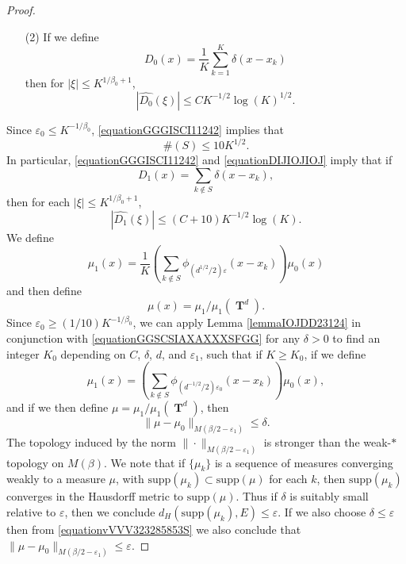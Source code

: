 \documentclass[12pt,reqno]{article}
\numberwithin{equation}{section}
\DeclareMathOperator{\TT}{\mathbf{T}}
\begin{document}
\begin{proof}
\begin{itemize}
        \item[(2)] If we define
        \[ D_0(x) = \frac{1}{K} \sum_{k = 1}^K \delta(x - x_k) \]
        then for $|\xi| \leq K^{1/\beta_0 + 1}$,
        \begin{equation} \label{equationGGGISCI11242}
            |\widehat{D_0}(\xi)| \leq C K^{-1/2} \log(K)^{1/2}.
        \end{equation}
    \end{itemize}
    Since $\varepsilon_0 \leq K^{-1/\beta_0}$, \eqref{equationGGGISCI11242} implies that
    \begin{equation} \label{equationDIJIOJIOJ}
        \#(S) \leq 10 K^{1/2}.
    \end{equation}
    In particular, \eqref{equationGGGISCI11242} and \eqref{equationDIJIOJIOJ} imply that if
    \[ D_1(x) = \sum_{k \not \in S} \delta(x - x_k), \]
    then for each $|\xi| \leq K^{1/\beta_0 + 1}$,
    \begin{equation} \label{equationGGSCSIAXAXXXSFGG}
        |\widehat{D_1}(\xi)| \leq (C+10) K^{-1/2} \log(K).
    \end{equation}
    We define
    \[ \mu_1(x) = \frac{1}{K} \left( \sum_{k \not \in S} \phi_{(d^{1/2}/2) \varepsilon}(x - x_k) \right) \mu_0(x) \]
    and then define
    \begin{equation}
        \mu(x) = \mu_1 / \mu_1(\TT^d).
    \end{equation}
    Since $\varepsilon_0 \geq (1/10) K^{-1/\beta_0}$, we can apply Lemma \ref{lemmaIOJDD23124} in conjunction with \eqref{equationGGSCSIAXAXXXSFGG} for any $\delta > 0$ to find an integer $K_0$ depending on $C$, $\delta$, $d$, and $\varepsilon_1$, such that if $K \geq K_0$, if we define
    \[ \mu_1(x) = \left( \sum_{k \not \in S} \phi_{(d^{-1/2}/2) \varepsilon_0}(x - x_k) \right) \mu_0(x), \]
    and if we then define $\mu = \mu_1 / \mu_1(\TT^d)$, then
    \begin{equation} \label{equationvVVV323285853S}
        \| \mu - \mu_0 \|_{M(\beta/2 - \varepsilon_1)} \leq \delta.
    \end{equation}
    The topology induced by the norm $\| \cdot \|_{M(\beta/2 - \varepsilon_1)}$ is stronger than the weak-$*$ topology on $M(\beta)$. We note that if $\{ \mu_k \}$ is a sequence of measures converging weakly to a measure $\mu$, with $\text{supp}(\mu_k) \subset \text{supp}(\mu)$ for each $k$, then $\text{supp}(\mu_k)$ converges in the Hausdorff metric to $\text{supp}(\mu)$. Thus if $\delta$ is suitably small relative to $\varepsilon$, then we conclude $d_H(\text{supp}(\mu_k), E) \leq \varepsilon$. If we also choose $\delta \leq \varepsilon$ then from \eqref{equationvVVV323285853S} we also conclude that $\| \mu - \mu_0 \|_{M(\beta/2 - \varepsilon_1)} \leq \varepsilon$.


\end{proof}
\end{document}
